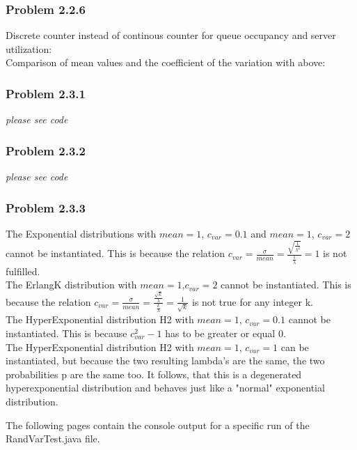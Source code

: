 \subsubsection*{Problem 2.2.6}
Discrete counter instead of continous counter for queue occupancy and server utilization:\\
Comparison of mean values and the coefficient of the variation with above: 




\subsubsection*{Problem 2.3.1}
\textit{please see code}
\subsubsection*{Problem 2.3.2}
\textit{please see code}
\subsubsection*{Problem 2.3.3}

The Exponential distributions with $mean=1$, $c_{var} = 0.1$ and $mean=1$, $c_{var}=2$ cannot be instantiated. This is because the relation $c_{var}=\frac{\sigma}{mean}=\frac{\sqrt{\frac{1}{\lambda^2}}}{\frac{1}{\lambda}}= 1$ is not fulfilled.\\
The ErlangK distribution with $mean=1$,$c_{var}=2$ cannot be instantiated. This is because the relation
$c_{var} = \frac{\sigma}{mean} = \frac{\frac{\sqrt{k}}{\lambda}}{\frac{k}{\lambda}} = \frac{1}{\sqrt{k}}$ is not true for any integer k.\\
The HyperExponential distribution H2 with $mean=1$, $c_{var} = 0.1$ cannot be instantiated. This is because $c_{var}^2 - 1$ has to be greater or equal $0$.\\
The HyperExponential distribution H2 with $mean=1$, $c_{var}=1$ can be instantiated, but because the two resulting lambda's are the same, the two probabilities p are the same too. It follows, that this is a degenerated hyperexponential distribution and behaves just like a "normal" exponential distribution.

The following pages contain the console output for a specific run of the RandVarTest.java file.\\
